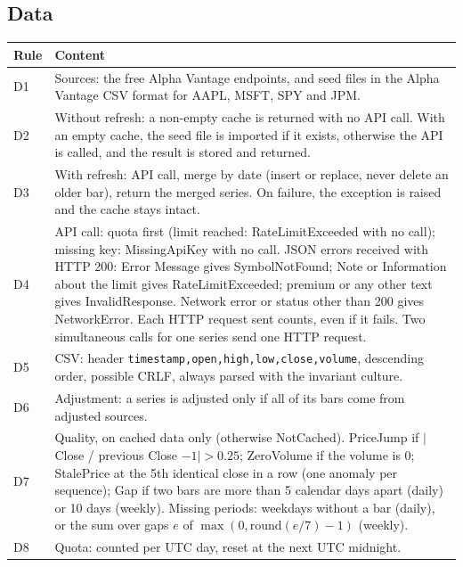 \documentclass[11pt,a4paper]{article}
\newcommand{\code}[1]{\texttt{\small #1}}
\begin{document}
\subsection*{Data}
\begin{longtable}{@{}p{0.9cm}p{14.8cm}@{}}
\toprule
\textbf{Rule} & \textbf{Content} \\
\midrule
\endhead
D1 & Sources: the free Alpha Vantage endpoints, and seed files in the Alpha Vantage CSV format for AAPL, MSFT, SPY and JPM. \\
D2 & Without refresh: a non-empty cache is returned with no API call. With an empty cache, the seed file is imported if it exists, otherwise the API is called, and the result is stored and returned. \\
D3 & With refresh: API call, merge by date (insert or replace, never delete an older bar), return the merged series. On failure, the exception is raised and the cache stays intact. \\
D4 & API call: quota first (limit reached: RateLimitExceeded with no call); missing key: MissingApiKey with no call. JSON errors received with HTTP 200: Error Message gives SymbolNotFound; Note or Information about the limit gives RateLimitExceeded; premium or any other text gives InvalidResponse. Network error or status other than 200 gives NetworkError. Each HTTP request sent counts, even if it fails. Two simultaneous calls for one series send one HTTP request. \\
D5 & CSV: header \code{timestamp,open,high,low,close,volume}, descending order, possible CRLF, always parsed with the invariant culture. \\
D6 & Adjustment: a series is adjusted only if all of its bars come from adjusted sources. \\
D7 & Quality, on cached data only (otherwise NotCached). PriceJump if $|$Close / previous Close $- 1| > 0.25$; ZeroVolume if the volume is 0; StalePrice at the 5th identical close in a row (one anomaly per sequence); Gap if two bars are more than 5 calendar days apart (daily) or 10 days (weekly). Missing periods: weekdays without a bar (daily), or the sum over gaps $e$ of $\max(0, \text{round}(e/7) - 1)$ (weekly). \\
D8 & Quota: counted per UTC day, reset at the next UTC midnight. \\
\bottomrule
\end{longtable}

\clearpage
\end{document}
